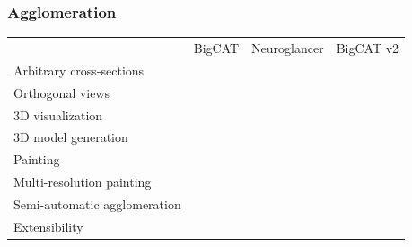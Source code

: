 \documentclass[aspectratio=169,table]{beamer}
\newcommand{\cmark}{\ding{51}}%
\newcommand{\xmark}{\ding{55}}%
\newcommand{\gcmark}{{\color{green}\cmark}}%
\newcommand{\ycmark}{{\color{yellow}\cmark}}%
\newcommand{\rxmark}{{\color{red}\xmark}}%
\begin{document}
\begin{frame}
    \frametitle{Agglomeration}
    \small
    \vspace{1cm}
    \begin{table}
        \centering
        \begin{tabular}{lccc}
                                       & BigCAT & Neuroglancer & BigCAT v2 \\
          Arbitrary cross-sections     & \gcmark & \gcmark & \gcmark \\
          Orthogonal views             & \rxmark & \gcmark & \gcmark \\ 
          3D visualization             & \rxmark & \gcmark & \gcmark \\ 
          3D model generation          & \rxmark & \rxmark & \gcmark \\ 
          Painting                     & \gcmark & \rxmark & \gcmark \\ 
          Multi-resolution painting         & \rxmark & \rxmark & \gcmark \\ 
          \rowcolor{black!20} Semi-automatic agglomeration & \rxmark & \rxmark & \gcmark \\ 
          Extensibility                & \rxmark & \ycmark & \gcmark \\
        \end{tabular}
    \end{table}
\end{frame}
\end{document}
